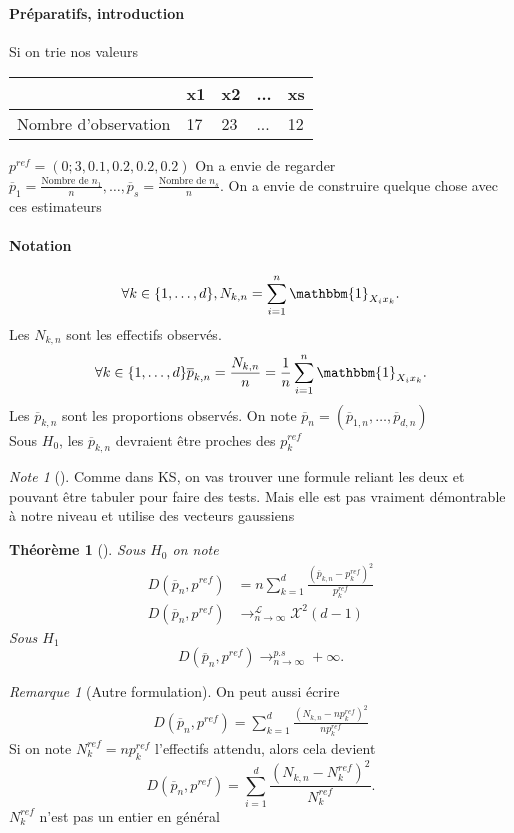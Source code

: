 \documentclass{article}
\theoremstyle{plain}%
\newtheorem{thm}{Théorème}[section]
\theoremstyle{definition}
\theoremstyle{remark}
\newtheorem*{rem}{Remarque}
\newtheorem*{note}{Note}
\begin{document}
\paragraph{Préparatifs, introduction } Si on trie nos valeurs 
\begin{table}[!h]
    \centering
    \begin{tabular}{|l|l|l|l|l|}
    \hline
        ~ & x1 & x2 & ... & xs \\ \hline
        Nombre d'observation & 17 & 23 & ... & 12 \\ \hline
    \end{tabular}
\end{table}
$ p^{ref} = (0;3, 0.1, 0.2, 0.2, 0.2) $ On a envie de regarder $ \overline{p}_1 = \frac{\text{Nombre de } n_1}{n}, \dots, \overline{p}_s = \frac{\text{Nombre de }n_s}{n}$. On a envie de construire quelque chose avec ces estimateurs 

\paragraph*{Notation} 

\[
    \forall k \in \{1,\dots,d\}, N_{k,n} = \sum_{i=1}^{n}\mathbbm{1}_{X_i x_k}
.\]
Les $ N_{k,n} $ sont les effectifs observés.
\[
    \forall k \in \{1,\dots,d\} \overline{p}_{k,n} = \frac{N_{k,n}}{n} = \frac{1}{n}\sum_{i=1}^{n}\mathbbm{1}_{X_i x_k}
.\]
Les $ \overline{p}_{k,n} $ sont les proportions observés. On note $ \overline{p}_n = (\overline{p}_{1,n}, \dots, \overline{p}_{d,n}) $ \\
Sous $ H_0 $, les $ \overline{p}_{k,n} $ devraient être proches des $ p_k^{ref} $ 

\begin{note}[]
    Comme dans KS, on vas trouver une formule reliant les deux et pouvant être tabuler pour faire des tests. Mais elle est pas vraiment démontrable à notre niveau et utilise des vecteurs gaussiens
\end{note}

\begin{thm}[]
    Sous $ H_0 $ on note 
    \begin{align*}
        D(\overline{p}_n, p^{ref}) &= n \sum_{k=1}^{d}\frac{(\overline{p}_{k,n} - p_k^{ref})^2}{p_k^{ref}} \\
        D(\overline{p}_n, p^{ref}) &\to ^{\mathcal{L}}_{n \to \infty } \mathcal{X}^2(d-1)
    \end{align*}
    Sous $ H_1 $ 
    \[
        D(\overline{p}_n, p^{ref}) \to^{p.s}_{n \to \infty } + \infty 
    .\]
\end{thm}
\begin{rem}[Autre formulation]
    On peut aussi écrire 
    \begin{align*}
        D(\overline{p}_n, p^{ref}) = \sum_{k=1}^{d} \frac{(N_{k,n} - np_k^{ref})^2}{n p_k^{ref}}
    \end{align*}
    Si on note $ N_k^{ref} = np_k^{ref} $ l'effectifs attendu, alors cela devient 
    \[
        D(\overline{p}_n, p^{ref}) = \sum_{i=1}^{d} \frac{(N_{k,n} - N_k^{ref})^2}{N_k^{ref}}
    .\]
    $ N_k^{ref} $ n'est pas un entier en général
\end{rem}
\end{document}
